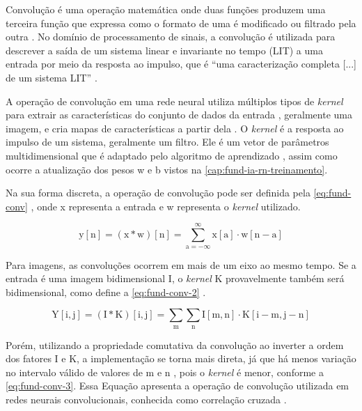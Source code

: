 Convolução é uma operação matemática onde duas funções produzem uma terceira função que expressa como o formato de uma é modificado ou filtrado pela outra \cite{ref:Yan}. No domínio de processamento de sinais, a convolução é utilizada para descrever a saída de um sistema linear e invariante no tempo (LIT) a uma entrada por meio da resposta ao impulso, que é ``uma caracterização completa [...] de um sistema LIT'' \cite{ref:Oppenheim-Schafer}.


A operação de convolução em uma rede neural utiliza múltiplos tipos de \textit{kernel} para extrair as características do conjunto de dados da entrada \cite{ref:Eden-Ierapetritou-Towler}, geralmente uma imagem, e cria mapas de características a partir dela \cite{ref:Gholamalinezhad-Khosravi}. O \textit{kernel} é a resposta ao impulso de um sistema, geralmente um filtro. Ele é um vetor de parâmetros multidimensional que é adaptado pelo algoritmo de aprendizado \cite{ref:Goodfellow-Bengio-Courville}, assim como ocorre a atualização dos pesos w e b vistos na \autoref{cap:fund-ia-rn-treinamento}.

Na sua forma discreta, a operação de convolução pode ser definida pela \autoref{eq:fund-conv} \cite{ref:Goodfellow-Bengio-Courville}, onde x representa a entrada e w representa o \textit{kernel} utilizado.

\begin{equation} \label{eq:fund-conv}
\mathrm{
  y[n] = (x \ast w)[n] = \sum_{a = -\infty}^{\infty} x[a] \cdot w [n - a]
}
\end{equation}

Para imagens, as convoluções ocorrem em mais de um eixo ao mesmo tempo. Se a entrada é uma imagem bidimensional I, o \textit{kernel} K provavelmente também será bidimensional, como define a \autoref{eq:fund-conv-2} \cite{ref:Goodfellow-Bengio-Courville}.

\begin{equation} \label{eq:fund-conv-2}
\mathrm{
  Y[i, j] = (I \ast K)[i, j] = \sum_{m} \sum_{n} I[m,n] \cdot K [i-m, j-n]
}
\end{equation}

Porém, utilizando a propriedade comutativa da convolução ao inverter a ordem dos fatores I e K, a implementação se torna mais direta, já que há menos variação no intervalo válido de valores de m e n \cite{ref:Goodfellow-Bengio-Courville}, pois o \textit{kernel} é menor, conforme a \autoref{eq:fund-conv-3}. Essa Equação apresenta a operação de convolução utilizada em redes neurais convolucionais, conhecida como correlação cruzada \cite{ref:Goodfellow-Bengio-Courville}.

